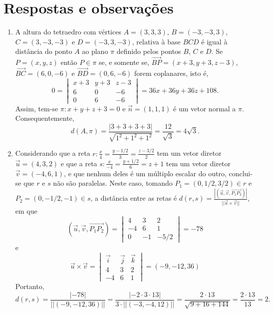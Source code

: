\documentclass[12pt,a4paper]{article}
\newcommand{\vect}[1]{\overrightarrow{#1}}
\begin{document}
\section*{Respostas e observações}
\begin{enumerate}
\item A altura do tetraedro com vértices $A=(3,3,3)$, $B=(-3,-3,3)$, $C=(3,-3,-3)$ e $D=(-3,3,-3)$, relativa à base $BCD$ é igual à distância do ponto $A$ ao plano $\pi$ definido pelos pontos $B$, $C$ e $D$. Se $P = (x,y,z)$ então $P \in \pi$ se, e somente se, $\vect{BP}=(x+3,y+3,z-3)$, $\vect{BC}=(6,0,-6)$ e $\vect{BD}=(0,6,-6)$ forem coplanares, isto é,
\[
0=\begin{vmatrix}
x+3 & y+3 & z-3\\
  6 &   0 &  -6\\
  0 &   6 &  -6
\end{vmatrix}
= 36x+36y+36z+108.
\]
Assim, tem-se $\pi: x+y+z+3=0$ e $\vec{n}=(1,1,1)$ é um vetor normal a $\pi$. Consequentemente,
\[
d(A,\pi)
= \frac{|3+3+3+3|}{\sqrt{1^2+1^2+1^2}}
= \frac{12}{\sqrt{3}}
= 4 \sqrt{3}.
\]

\item Considerando que a reta $r: \frac{x}{4} = \frac{y-1/2}{3} = \frac{z-3/2}{2}$ tem um vetor diretor $\vec{u}=(4,3,2)$ e que a reta $s: \frac{x}{-4} = \frac{y+1/2}{6} = z+1$ tem um vetor diretor $\vec{v}=(-4,6,1)$, e que nenhum deles é um múltiplo escalar do outro, conclui-se que $r$ e $s$ não são paralelas. Neste caso, tomando $P_1 = (0,1/2,3/2) \in r$ e $P_2 = (0,-1/2,-1) \in s$, a distância entre as retas é $d(r, s)
= \frac{ \left| ( \vec{u}, \vec{v}, \vect{P_1P_2} ) \right| }
     { || \vec{u} \times \vec{v} || }
$, em que
\[
( \vec{u}, \vec{v}, \vect{P_1P_2} )
= \begin{vmatrix}
 4 &  3 &  2\\
-4 &  6 &  1\\
 0 & -1 & -5/2
\end{vmatrix}
=-78
\]
e
\[
\vec{u} \times \vec{v}
= \begin{vmatrix}
\vec{i} & \vec{j} & \vec{k}\\
 4 & 3 & 2\\
-4 & 6 & 1
\end{vmatrix}
=(-9, -12, 36)
\]
Portanto,
\[
d(r, s)
= \frac{ \left| -78 \right| }
     { || (-9, -12, 36) || }
= \frac{ \left| -2\cdot 3 \cdot 13 \right| }
     { 3 \cdot || (-3, -4, 12) || }
= \frac{ 2 \cdot 13 }
     { \sqrt{9+16+144} }
=
\frac{ 2 \cdot 13 }
     { 13 }
= 2.
\]


\end{enumerate}
\end{document}
